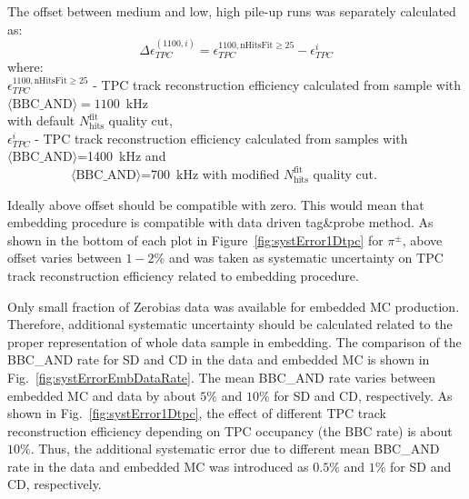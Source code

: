 The offset between medium and low, high pile-up runs was separately calculated as:
\begin{equation}
\Delta\epsilon_{ TPC}^{(1100,i)} = \epsilon_{ TPC}^{1100, \text{nHitsFit}\geq 25}-\epsilon_{ TPC}^{i}
\label{eq:tpcSystDifference}
\end{equation}
where:\\[5pt]
$\epsilon_{ TPC}^{1100, \text{nHitsFit}\geq 25}$ - TPC track reconstruction efficiency calculated from sample with \mbox{$\langle\text{BBC\_AND}\rangle=1100$~kHz}\\\hspace*{70pt}with default $N_{\text{hits}}^{\text{fit}}$ quality cut,\\
$\epsilon_{ TPC}^{i}$ - TPC track reconstruction efficiency calculated from  samples with  \mbox{$\langle\text{BBC\_AND}\rangle$=1400~kHz} and \\\mbox{~~~~~~~~~~$\langle\text{BBC\_AND}\rangle$=700~kHz}  with modified $N_{\text{hits}}^{\text{fit}}$ quality cut.

Ideally above offset should be compatible with zero. This would mean that embedding procedure is compatible with data driven tag\&probe method. As shown in  the bottom of each plot in Figure~\ref{fig:systError1Dtpc}  for $\pi^\pm$,  above offset varies between $1-2\%$ and was taken as systematic uncertainty on TPC track reconstruction efficiency related to embedding procedure.





Only small fraction of Zerobias data was available for embedded MC production. Therefore, additional systematic uncertainty should be calculated related to the proper representation of whole data sample in embedding. The comparison of the BBC\_AND rate for SD and CD in the data and embedded MC is shown in Fig.~\ref{fig:systErrorEmbDataRate}. The mean BBC\_AND rate varies between embedded MC and data by about  $5\%$ and $10\%$ for SD and CD, respectively. As shown in Fig.~\ref{fig:systError1Dtpc}, the effect of different TPC track reconstruction efficiency depending on TPC occupancy (the BBC rate) is about $10\%$.  Thus, the additional systematic error due to different mean BBC\_AND rate in the data and embedded MC was introduced as  $0.5\%$ and $1\%$ for SD and CD, respectively.
	
